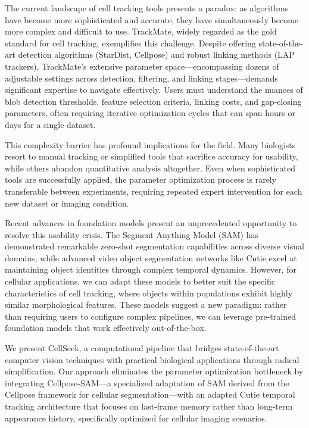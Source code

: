 \documentclass[12pt]{article}
\begin{document}
The current landscape of cell tracking tools presents a paradox: as algorithms have become more sophisticated and accurate, they have simultaneously become more complex and difficult to use. TrackMate, widely regarded as the gold standard for cell tracking, exemplifies this challenge. Despite offering state-of-the-art detection algorithms (StarDist, Cellpose) and robust linking methods (LAP trackers), TrackMate's extensive parameter space—encompassing dozens of adjustable settings across detection, filtering, and linking stages—demands significant expertise to navigate effectively. Users must understand the nuances of blob detection thresholds, feature selection criteria, linking costs, and gap-closing parameters, often requiring iterative optimization cycles that can span hours or days for a single dataset.

This complexity barrier has profound implications for the field. Many biologists resort to manual tracking or simplified tools that sacrifice accuracy for usability, while others abandon quantitative analysis altogether. Even when sophisticated tools are successfully applied, the parameter optimization process is rarely transferable between experiments, requiring repeated expert intervention for each new dataset or imaging condition.

Recent advances in foundation models present an unprecedented opportunity to resolve this usability crisis. The Segment Anything Model (SAM) has demonstrated remarkable zero-shot segmentation capabilities across diverse visual domains, while advanced video object segmentation networks like Cutie excel at maintaining object identities through complex temporal dynamics. However, for cellular applications, we can adapt these models to better suit the specific characteristics of cell tracking, where objects within populations exhibit highly similar morphological features. These models suggest a new paradigm: rather than requiring users to configure complex pipelines, we can leverage pre-trained foundation models that work effectively out-of-the-box.

We present CellSeek, a computational pipeline that bridges state-of-the-art computer vision techniques with practical biological applications through radical simplification. Our approach eliminates the parameter optimization bottleneck by integrating Cellpose-SAM—a specialized adaptation of SAM derived from the Cellpose framework for cellular segmentation—with an adapted Cutie temporal tracking architecture that focuses on last-frame memory rather than long-term appearance history, specifically optimized for cellular imaging scenarios.
\end{document}
